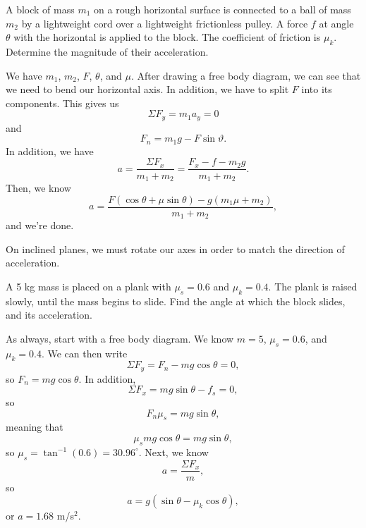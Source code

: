 \documentclass[11pt]{article}
\begin{document}
\begin{example}
	A block of mass $m_1$ on a rough horizontal surface is connected to a ball of mass $m_2$ by a lightweight cord over a lightweight frictionless pulley. A force $f$ at angle $\theta$ with the horizontal is applied to the block. The coefficient of friction is $\mu_k$. Determine the magnitude of their acceleration.
\end{example}
\begin{solution}
	We have $m_1$, $m_2$, $F$, $\theta$, and $\mu$. After drawing a free body diagram, we can see that we need to bend our horizontal axis. In addition, we have to split $F$ into its components. This gives us
	\[\Sigma F_y = m_1a_y = 0\]
	and
	\[F_n = m_1g-F\sin\vartheta.\]
	In addition, we have
	\[a = \frac{\Sigma F_x}{m_1 + m_2} = \frac{F_x - f - m_2g}{m_1+m_2}.\]
	Then, we know
	\[a = \frac{F(\cos\theta + \mu\sin\theta) - g(m_1\mu + m_2)}{m_1 + m_2},\]
	and we're done.
\end{solution}

\medskip

\noindent On inclined planes, we must rotate our axes in order to match the direction of acceleration.
\begin{example}
	A 5 kg mass is placed on a plank with $\mu_s = 0.6$ and $\mu_k = 0.4$. The plank is raised slowly, until the mass begins to slide. Find the angle at which the block slides, and its acceleration.
\end{example}
\begin{solution}
	As always, start with a free body diagram. We know $m = 5$, $\mu_s = 0.6$, and $\mu_k = 0.4$. We can then write
	\[\Sigma F_y = F_n - mg\cos\theta = 0,\]
	so $F_n = mg\cos\theta$. In addition,
	\[\Sigma F_x = mg\sin\theta - f_s = 0,\]
	so
	\[F_n\mu_s = mg\sin\theta,\]
	meaning that
	\[\mu_smg\cos\theta = mg\sin\theta,\]
	so $\mu_s = \tan^{-1} (0.6) = 30.96^{\circ}.$ Next, we know
	\[a = \frac{\Sigma F_x}{m},\]
	so
	\[a = g(\sin\theta - \mu_k\cos\theta),\]
	or $a = 1.68$ m/s$^2$.
\end{solution}
\end{document}
